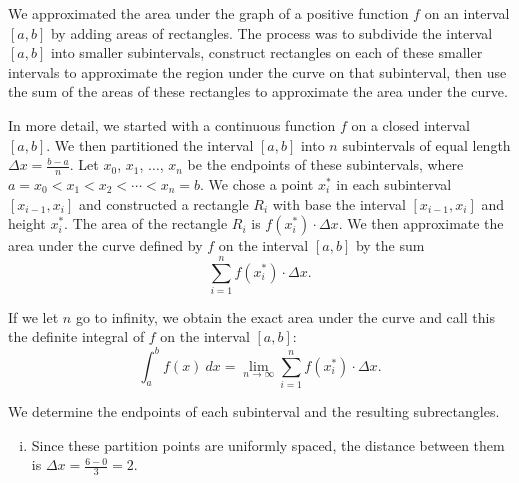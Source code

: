 \begin{activitySolution}
    \ba
    \item  We approximated the area under the graph of a positive function $f$ on an interval $[a,b]$ by adding areas of rectangles. The process was to subdivide the interval $[a,b]$ into smaller subintervals, construct rectangles on each of these smaller intervals to approximate the region under the curve on that subinterval, then use the sum of the areas of these rectangles to approximate the area under the curve.


In more detail, we started with a continuous function $f$ on a closed interval $[a,b]$. We then partitioned the interval $[a, b]$ into $n$ subintervals of equal length $\Delta x = \frac{b-a}{n}$. Let $x_0$, $x_1$, $\ldots$, $x_n$ be the endpoints of these subintervals, where $a = x_0<x_1<x_2 < \cdots < x_n = b$. We chose a point $x_i^*$ in each subinterval $[x_{i-1},x_i]$ and constructed a rectangle $R_i$ with base the interval  $[x_{i-1},x_i]$ and height $x_i^*$. The area of the rectangle $R_i$ is $f\left(x_i^*\right) \cdot \Delta x$. We then approximate the area under the curve defined by $f$ on the interval $[a,b]$ by the sum
\[\sum_{i=1}^n f\left(x_i^*\right) \cdot \Delta x.\]

If we let $n$ go to infinity, we obtain the exact area under the curve and call this the definite integral of $f$ on the interval $[a,b]$:
\[\int_a^b f(x) \ dx = \lim_{n \to \infty} \sum_{i=1}^n f\left(x_i^*\right) \cdot \Delta x.\]


    \item We determine the endpoints of each subinterval and the resulting subrectangles.
            \begin{enumerate}[i.]
            \item Since these partition points are uniformly spaced, the distance between them is $\Delta x = \frac{6-0}{3} = 2$.


\end{enumerate}
\end{activitySolution}
